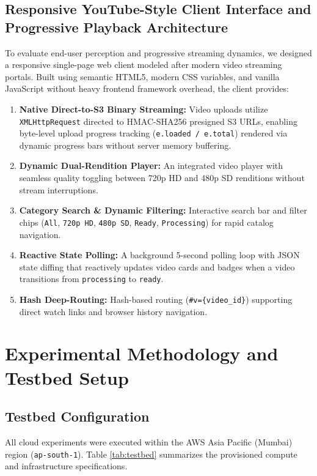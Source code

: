 \documentclass[conference]{IEEEtran}
\begin{document}
\subsection{Responsive YouTube-Style Client Interface and Progressive Playback Architecture}
To evaluate end-user perception and progressive streaming dynamics, we designed a responsive single-page web client modeled after modern video streaming portals. Built using semantic HTML5, modern CSS variables, and vanilla JavaScript without heavy frontend framework overhead, the client provides:
\begin{enumerate}
    \item \textbf{Native Direct-to-S3 Binary Streaming:} Video uploads utilize \texttt{XMLHttpRequest} directed to HMAC-SHA256 presigned S3 URLs, enabling byte-level upload progress tracking (\texttt{e.loaded / e.total}) rendered via dynamic progress bars without server memory buffering.
    \item \textbf{Dynamic Dual-Rendition Player:} An integrated video player with seamless quality toggling between 720p HD and 480p SD renditions without stream interruptions.
    \item \textbf{Category Search \& Dynamic Filtering:} Interactive search bar and filter chips (\texttt{All}, \texttt{720p HD}, \texttt{480p SD}, \texttt{Ready}, \texttt{Processing}) for rapid catalog navigation.
    \item \textbf{Reactive State Polling:} A background 5-second polling loop with JSON state diffing that reactively updates video cards and badges when a video transitions from \texttt{processing} to \texttt{ready}.
    \item \textbf{Hash Deep-Routing:} Hash-based routing (\texttt{\#v=\{video\_id\}}) supporting direct watch links and browser history navigation.
\end{enumerate}

\section{Experimental Methodology and Testbed Setup}

\subsection{Testbed Configuration}
All cloud experiments were executed within the AWS Asia Pacific (Mumbai) region (\texttt{ap-south-1}). Table \ref{tab:testbed} summarizes the provisioned compute and infrastructure specifications.
\end{document}
